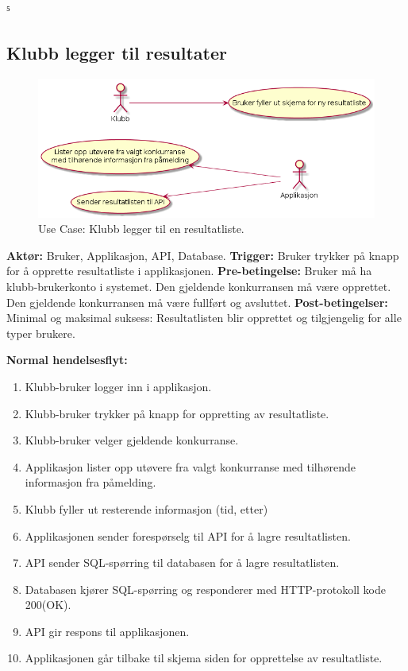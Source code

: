 ⁵\documentclass[norsk]{article}
\begin{document}
    \subsection{Klubb legger til resultater}
    \begin{figure}[H]
        \centering
            \includegraphics[scale=0.55]{images/uc-add-athlete-results.png}
            \caption{Use Case: Klubb legger til en resultatliste.}\label{fig:uc-add-athlete-results}
        \end{figure}
    \textbf{Aktør:} Bruker, Applikasjon, API, Database.\newline
    \textbf{Trigger:} Bruker trykker på knapp for å opprette resultatliste i applikasjonen. \newline
    \textbf{Pre-betingelse:} Bruker må ha klubb-brukerkonto i systemet. 
    Den gjeldende konkurransen må være opprettet.
    Den gjeldende konkurransen må være fullført og avsluttet.\newline
    \textbf{Post-betingelser:} Minimal og maksimal suksess: Resultatlisten blir opprettet og tilgjengelig for alle typer brukere. \newline

    \textbf{Normal hendelsesflyt:}
    \begin{enumerate}
        \item Klubb-bruker logger inn i applikasjon. 
        \item \label{itm:2A}Klubb-bruker trykker på knapp for oppretting av resultatliste.
        \item Klubb-bruker velger gjeldende konkurranse. 
        \item \label{itm:2B}Applikasjon lister opp utøvere fra valgt konkurranse med tilhørende informasjon fra påmelding.
        \item Klubb fyller ut resterende informasjon (tid, etter) 
        \item Applikasjonen sender forespørselg til API for å lagre resultatlisten. 
        \item \label{itm:2C}API sender SQL-spørring til databasen for å lagre resultatlisten. 
        \item Databasen kjører SQL-spørring og responderer med HTTP-protokoll kode 200(OK).
        \item API gir respons til applikasjonen. 
        \item Applikasjonen går tilbake til skjema siden for opprettelse av resultatliste. 
    \end{enumerate}
    
\end{document}
